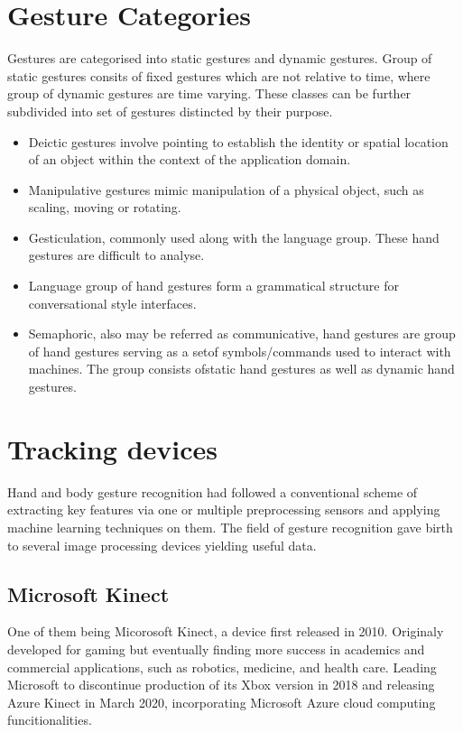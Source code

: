 

\section{Gesture Categories}
Gestures are categorised into static gestures and dynamic gestures. Group of static gestures consits of fixed gestures which are not relative to time, where group of dynamic gestures are time varying. These classes can be further subdivided into set of gestures distincted by their purpose.


\begin{itemize}
	\item Deictic gestures involve pointing to establish the identity or spatial location of an object within the context of the application domain. \cite{taxonomi}
	\item Manipulative gestures mimic manipulation of a physical object, such as scaling, moving or rotating.
	\item Gesticulation, commonly used along with the language group. These hand gestures are difficult to analyse.
	\item Language group of hand gestures form a grammatical structure for conversational style interfaces.
	\item Semaphoric, also may be referred as communicative, hand gestures are group of hand gestures serving as a setof symbols/commands used to interact with machines. The group consists ofstatic hand gestures as well as dynamic hand gestures. 
\end{itemize}


\section{Tracking devices}
Hand and body gesture recognition had followed a conventional scheme of extracting key features via one or multiple preprocessing sensors and applying machine learning techniques on them.\cite{avola} The field of gesture recognition gave birth to several image processing devices yielding useful data. 
\subsection{Microsoft Kinect}
One of them being Micorosoft Kinect, a device first released in 2010. Originaly developed for gaming but eventually finding more success in academics and commercial applications, such as robotics, medicine, and health care. Leading Microsoft to discontinue production of its Xbox version in 2018 and releasing Azure Kinect in March 2020, incorporating Microsoft Azure cloud computing funcitionalities.

